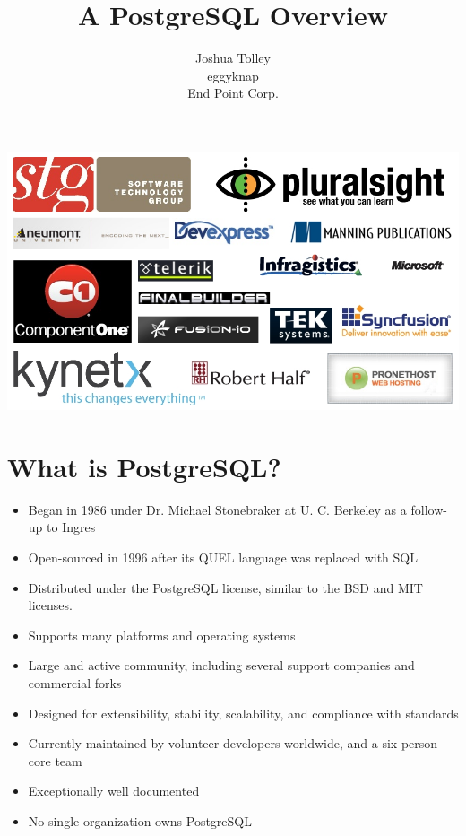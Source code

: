 \documentclass[svgnames]{beamer}
\begin{document}
\title{A PostgreSQL Overview}
\author{Joshua Tolley \\ eggyknap \\ End Point Corp.}

\begin{frame}
    \includegraphics[scale=.45]{Sponsor_slide.png}
\end{frame}

\frame{\titlepage}

\section{What is PostgreSQL?}
\begin{frame}
    \begin{itemize}
       \item Began in 1986 under Dr. Michael Stonebraker at U. C. Berkeley as a follow-up to Ingres
       \item Open-sourced in 1996 after its QUEL language was replaced with SQL
       \item Distributed under the PostgreSQL license, similar to the BSD and MIT licenses.
       \item Supports many platforms and operating systems
       \item Large and active community, including several support companies and commercial forks
       \item Designed for extensibility, stability, scalability, and compliance with standards
       \item Currently maintained by volunteer developers worldwide, and a six-person core team
       \item Exceptionally well documented
       \item No single organization owns PostgreSQL
    \end{itemize}
\end{frame}
\end{document}

